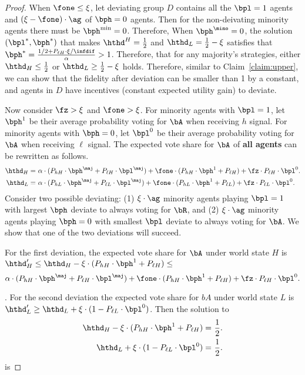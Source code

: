 \begin{proof}
    When $\fone \le \xi$, let deviating group $D$ contains all the $\bpl = 1$ agents and $(\xi - \fone)\cdot \ag$ of $\bph = 0$ agents. Then for the non-deivating minority agents there must be $\bph^{\min} = 0$. Therefore, When $\bph^{\mino} = 0$, the solution $(\bpl^*, \bph^*)$ that makes $\hthd^H = \frac12$ and $\hthd_L = \frac12 - \xi$ satisfies that $\bph^* = \frac{1/2 + P_{\ell H} \cdot \xi /\infdif}{\alpha} >  1$. Therefore, that for any majority's strategies, either $\hthd_H \le \frac12$ or $\hthd_L \ge \frac12 - \xi$ holds. Therefore, similar to Claim~\ref{claim:upper}, we can show that the fidelity after deviation can be smaller than 1 by a constant, and agents in $D$ have incentives (constant expected utility gain) to deviate. 

    Now consider $\fz > \xi$ and $\fone > \xi$. For minority agents with $\bpl = 1$, let $\bph^1$ be their average probability voting for $\bA$ when receiving $h$ signal. For minority agents with $\bph = 0$, let $\bpl^0$ be their average probability voting for $\bA$ when receiving $\ell$ signal. The expected vote share for $\bA$ of \textbf{all agents} can be rewritten as follows.   
    \begin{align*}
        \hthd_H = &\ \alpha\cdot (P_{hH}\cdot \bph^{\maj} + P_{\ell H}\cdot \bpl^{\maj}) +  \fone \cdot  (P_{hH} \cdot \bph^1+ P_{\ell H} ) + \fz \cdot P_{\ell H} \cdot \bpl^0.\\
        \hthd_L = &\ \alpha\cdot(P_{hL}\cdot \bph^{\maj} + P_{\ell L}\cdot \bpl^{\maj})+ \fone \cdot  (P_{hL} \cdot \bph^1+ P_{\ell L} ) + \fz \cdot P_{\ell L} \cdot \bpl^0.
    \end{align*}
     Consider two possible deviating: (1) $\xi\cdot \ag$ minority agents playing $\bpl = 1$ with largest $\bph$ deviate to always voting for $\bR$, and (2) $\xi\cdot \ag$ minority agents playing $\bph = 0$ with smallest $\bpl$ deviate to always voting for $\bA$. We show that one of the two deviations will succeed.

     For the first deviation, the expected vote share for $\bA$ under world state $H$ is  $\hthd'_H \le \hthd_H - \xi \cdot (P_{hH} \cdot \bph^1+ P_{\ell H})\le $
     $$\alpha\cdot (P_{hH}\cdot \bph^{\maj} + P_{\ell H}\cdot \bpl^{\maj}) +  \fone \cdot  (P_{hH} \cdot \bph^1+ P_{\ell H} ) + \fz \cdot P_{\ell H} \cdot \bpl^0.$$
     
    . For the second deviation the expected vote share for $bA$ under world state $L$ is 
     $\hthd'_L \ge \hthd_L + \xi \cdot (1 - P_{\ell L} \cdot \bpl^0)$. Then the solution to \begin{align*}
         \hthd_H - \xi \cdot (P_{hH} \cdot \bph^1+ P_{\ell H}) =&\ \frac12.\\
          \hthd_L + \xi\cdot (1 - P_{\ell L} \cdot \bpl^0)  =&\ \frac12.
     \end{align*}
    is 
    

\end{proof}
